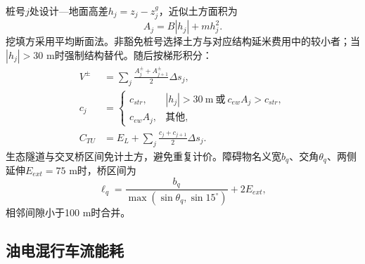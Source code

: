 \documentclass[preprint,12pt]{elsarticle}
\begin{document}
桩号$j$处设计—地面高差$h_j=z_j-z^g_j$，近似土方面积为
\begin{equation}
A_j=B|h_j|+m h_j^2.
\end{equation}
挖填方采用平均断面法。非豁免桩号选择土方与对应结构延米费用中的较小者；当$|h_j|>30$ m时强制结构替代。随后按梯形积分：
\begin{align}
V^{\pm}&=\sum_j\frac{A_j^{\pm}+A_{j+1}^{\pm}}{2}\Delta s_j,\\
c_j&=\begin{cases}
c_{str},& |h_j|>30~\mathrm{m}\ \text{或}\ c_{ew}A_j>c_{str},\\
c_{ew}A_j,&\text{其他},
\end{cases}\\
C_{TU}&=E_L+\sum_j\frac{c_j+c_{j+1}}{2}\Delta s_j.
\label{eq:earthwork_zh}
\end{align}
生态隧道与交叉桥区间免计土方，避免重复计价。障碍物名义宽$b_q$、交角$\theta_q$、两侧延伸$E_{ext}=75$ m时，桥区间为
\begin{equation}
\ell_q=\frac{b_q}{\max(\sin\theta_q,\sin15^\circ)}+2E_{ext},
\end{equation}
相邻间隙小于100 m时合并。

\begin{table}[t]
\centering
\caption{固定案例模型主要参数。}
\label{tab:parameters_zh}
\end{table}

\subsection{油电混行车流能耗}
\end{document}
